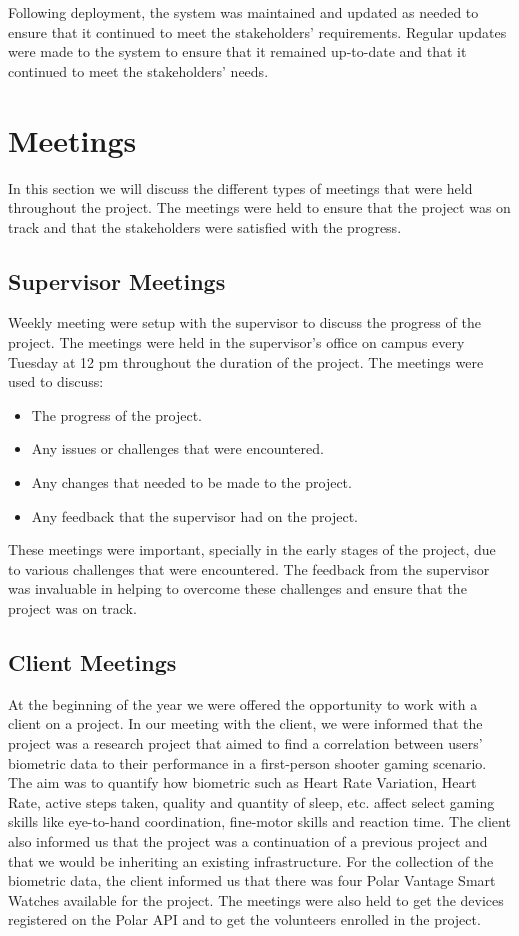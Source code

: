 Following deployment, the system was maintained and updated as needed to ensure that it continued to meet the stakeholders' requirements. Regular updates
were made to the system to ensure that it remained up-to-date and that it continued to meet the stakeholders' needs.

\section{Meetings}
In this section we will discuss the different types of meetings that were held throughout the project. The meetings were held to ensure that the project was on track
and that the stakeholders were satisfied with the progress.

\subsection{Supervisor Meetings}
Weekly meeting were setup with the supervisor to discuss the progress of the project. The meetings were held in the supervisor's office on campus every Tuesday at 12 pm throughout
the duration of the project. The meetings were used to discuss:

\begin{itemize}
    \item The progress of the project.
    \item Any issues or challenges that were encountered.
    \item Any changes that needed to be made to the project.
    \item Any feedback that the supervisor had on the project.
\end{itemize}

These meetings were important, specially in the early stages of the project, due to various challenges that were encountered. The feedback from the supervisor was invaluable
in helping to overcome these challenges and ensure that the project was on track. 

\subsection{Client Meetings}

At the beginning of the year we were offered the opportunity to work with a client on a project. In our meeting with the client, we were informed that the project
was a research project that aimed to find a correlation between users' biometric data to their performance in a first-person shooter gaming scenario. The aim was to quantify
how biometric such as Heart Rate Variation, Heart Rate, active steps taken, quality and quantity of sleep, etc. affect select gaming skills like eye-to-hand coordination, fine-motor skills and reaction time.
The client also informed us that the project was a continuation of a previous project and that we would be inheriting an existing infrastructure. 
For the collection of the biometric data, the client informed us that there was four Polar Vantage Smart Watches available for the project. The meetings were also held to get
the devices registered on the Polar API and to get the volunteers enrolled in the project. 

